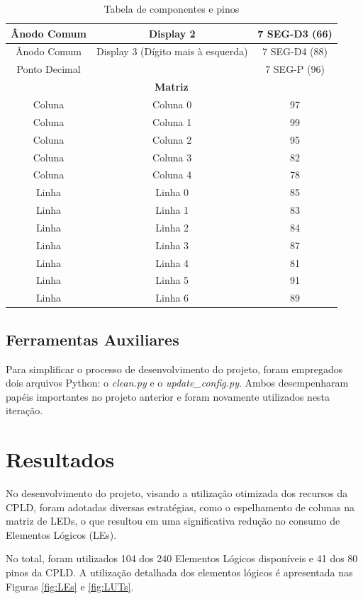 \documentclass[
	article,			%
	11pt,				%
	oneside,			%
	a4paper,			%
	english,			%
	brazil,				%
	sumario=tradicional
	]{abntex2}
\begin{document}
\begin{table}[H]
\begin{tabular}{|c|c|c|}
Ânodo Comum & Display 2 & 7 SEG-D3 (66) \\ \hline
Ânodo Comum & Display 3 (Dígito mais à esquerda) & 7 SEG-D4 (88) \\ \hline
Ponto Decimal & & 7 SEG-P (96) \\ \hline
\multicolumn{3}{|c|}{\textbf{Matriz}} \\ \hline
Coluna & Coluna 0 & 97 \\ \hline
Coluna & Coluna 1 & 99 \\ \hline
Coluna & Coluna 2 & 95 \\ \hline
Coluna & Coluna 3 & 82 \\ \hline
Coluna & Coluna 4 & 78 \\ \hline
Linha & Linha 0 & 85 \\ \hline
Linha & Linha 1 & 83 \\ \hline
Linha & Linha 2 & 84 \\ \hline
Linha & Linha 3 & 87 \\ \hline
Linha & Linha 4 & 81 \\ \hline
Linha & Linha 5 & 91 \\ \hline
Linha & Linha 6 & 89 \\ \hline
\end{tabular}
\caption{Tabela de componentes e pinos}
\label{tab:componentes-pinos}
\end{table}



\subsection{Ferramentas Auxiliares}

Para simplificar o processo de desenvolvimento do projeto, foram empregados dois arquivos Python: o \textit{clean.py} e o \textit{update\_config.py}. Ambos desempenharam papéis importantes no projeto anterior e foram novamente utilizados nesta iteração.


\section{Resultados}
No desenvolvimento do projeto, visando a utilização otimizada dos recursos da CPLD, foram adotadas diversas estratégias, como o espelhamento de colunas na matriz de LEDs, o que resultou em uma significativa redução no consumo de Elementos Lógicos (LEs).

No total, foram utilizados 104 dos 240 Elementos Lógicos disponíveis e 41 dos 80 pinos da CPLD. A utilização detalhada dos elementos lógicos é apresentada nas Figuras \ref{fig:LEs} e \ref{fig:LUTs}.
\end{document}
